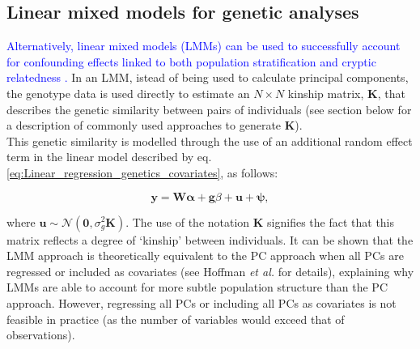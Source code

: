 
\subsection{Linear mixed models for genetic analyses}
\label{sec:LMM}

\textcolor{blue}{Alternatively, linear mixed models (LMMs) can be used to successfully account for confounding effects linked to both population stratification and cryptic relatedness 
\cite{yu2006unified, kang2008efficient,kang2010variance, price2010new, zhou2012genome, lee2018genome}.}
In an LMM, istead of being used to calculate principal components, the genotype data is used directly to estimate an $N \times N$ kinship matrix, $\mathbf{K}$, that describes the genetic similarity between pairs of individuals (see section below for a description of commonly used approaches to generate $\mathbf{K}$). \\

This genetic similarity is modelled through the use of an additional random effect term in the linear model described by eq. \eqref{eq:Linear_regression_genetics_covariates}, as follows:

\begin{equation}\label{eq:Linear_mixed_model}
 \mathbf{y} =  \mathbf{W}\boldsymbol{\alpha} + \mathbf{g}\beta + \mathbf{u} + \boldsymbol{\psi}, 
\end{equation}

where $\mathbf{u} \sim \mathcal{N}(\mathbf{0}, \sigma_g^2\mathbf{K})$.
The use of the notation $\mathbf{K}$ signifies the fact that this matrix reflects a degree of `kinship' between individuals. 
It can be shown that the LMM approach is theoretically equivalent to the PC
approach when all PCs are regressed or included as covariates (see Hoffman \textit{et al.} \cite{hoffman2013correcting} for details), explaining why LMMs are able to account for more subtle population structure than the PC approach. 
However, regressing all PCs or including all PCs as covariates is not feasible in practice (as the number of variables would exceed that of observations). 



